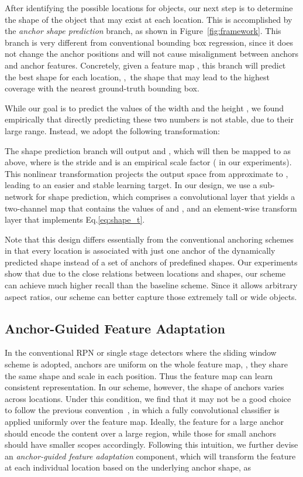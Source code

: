 \documentclass[10pt,twocolumn,letterpaper]{article}
\begin{document}
After identifying the possible locations for objects, our next step is to determine
the shape of the object that may exist at each location.
This is accomplished by the \emph{anchor shape prediction}
branch, as shown in Figure~\ref{fig:framework}.
This branch is very different from conventional bounding box regression,
since it does not change the anchor positions and will not cause misalignment
between anchors and anchor features.
Concretely, given a feature map , this branch will predict
the best shape  for each location, \ie,~the shape that may lead to the highest coverage with the nearest ground-truth bounding box.

While our goal is to predict the values of the width  and the height ,
we found empirically that directly predicting these two numbers is not stable,
due to their large range.
Instead, we adopt the following transformation:

The shape prediction branch will output  and  , which will then be mapped
to  as above, where  is the stride and  is an empirical
scale factor ( in our experiments).
This nonlinear transformation projects the output space from approximate
 to , leading to an easier and stable learning target.
In our design, we use a sub-network  for shape prediction, which
comprises a  convolutional layer that yields a two-channel map
that contains the values of  and , and an element-wise
transform layer that implements Eq.\eqref{eq:shape_t}.

Note that this design differs essentially from the conventional anchoring schemes
in that every location is associated with just one anchor of the dynamically predicted shape
instead of a set of anchors of predefined shapes.
Our experiments show that due to the close relations between locations and shapes,
our scheme can achieve much higher recall than the baseline scheme.
Since it allows arbitrary aspect ratios, our scheme can better capture
those extremely tall or wide objects.


\subsection{Anchor-Guided Feature Adaptation}
\label{subsec:feature-adaption}

In the conventional RPN or single stage detectors where the sliding window scheme
is adopted, anchors are uniform on the whole feature map, \ie, they share the
same shape and scale in each position. Thus the feature map can learn
consistent representation.
In our scheme, however, the shape of anchors varies across locations.
Under this condition, we find that it may not be a good choice to follow
the previous convention~\cite{ren2015faster}, in which a fully convolutional
classifier is applied uniformly over the feature map.
Ideally, the feature for a large anchor should encode the content over
a large region, while those for small anchors should have smaller scopes
accordingly.
Following this intuition, we further devise an
\emph{anchor-guided feature adaptation} component, which will transform
the feature at each individual location based on the underlying anchor shape,
as
\end{document}
